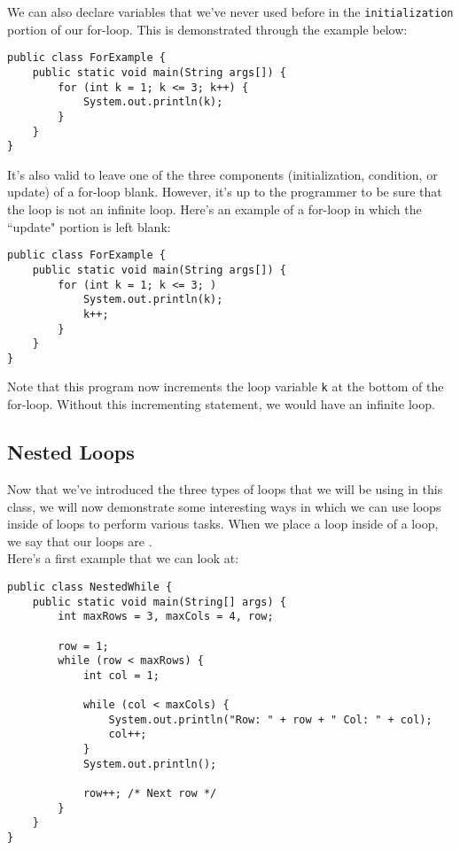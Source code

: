 We can also declare variables that we've never used before in the \verb!initialization! portion of our for-loop. This is demonstrated through the example below:

\begin{lstlisting}
public class ForExample {
    public static void main(String args[]) {
        for (int k = 1; k <= 3; k++) {
            System.out.println(k);
        }
    }
}
\end{lstlisting}

It's also valid to leave one of the three components (initialization, condition, or update) of a for-loop blank. However, it's up to the programmer to be sure that the loop is not an infinite loop. Here's an example of a for-loop in which the ``update" portion is left blank:

\begin{lstlisting}
public class ForExample {
    public static void main(String args[]) {
        for (int k = 1; k <= 3; )
            System.out.println(k);
            k++;
        }
    }
}
\end{lstlisting}

Note that this program now increments the loop variable \verb!k! at the bottom of the for-loop. Without this incrementing statement, we would have an infinite loop. 

\subsection{Nested Loops}

Now that we've introduced the three types of loops that we will be using in this class, we will now demonstrate some interesting ways in which we can use loops inside of loops to perform various tasks. When we place a loop inside of a loop, we say that our loops are .  \\


Here's a first example that we can look at:

\begin{lstlisting}
public class NestedWhile {
	public static void main(String[] args) {
		int maxRows = 3, maxCols = 4, row;

		row = 1;
		while (row < maxRows) {
			int col = 1;
			
			while (col < maxCols) {
				System.out.println("Row: " + row + " Col: " + col);
				col++;
			}
			System.out.println();

			row++; /* Next row */
		}
	}
}
\end{lstlisting}


